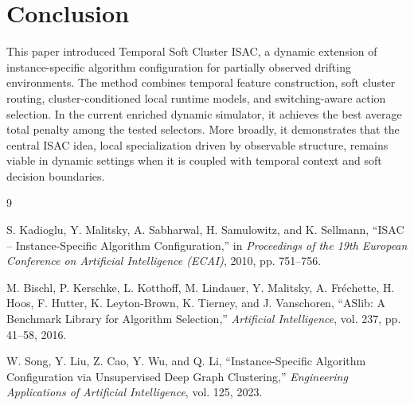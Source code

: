\documentclass[conference]{IEEEtran}
\begin{document}
\section{Conclusion}

This paper introduced Temporal Soft Cluster ISAC, a dynamic extension of instance-specific algorithm configuration for partially observed drifting environments. The method combines temporal feature construction, soft cluster routing, cluster-conditioned local runtime models, and switching-aware action selection. In the current enriched dynamic simulator, it achieves the best average total penalty among the tested selectors. More broadly, it demonstrates that the central ISAC idea, local specialization driven by observable structure, remains viable in dynamic settings when it is coupled with temporal context and soft decision boundaries.

\begin{thebibliography}{9}

S. Kadioglu, Y. Malitsky, A. Sabharwal, H. Samulowitz, and K. Sellmann,
``ISAC -- Instance-Specific Algorithm Configuration,''
in \emph{Proceedings of the 19th European Conference on Artificial Intelligence (ECAI)}, 2010, pp. 751--756.

M. Bischl, P. Kerschke, L. Kotthoff, M. Lindauer, Y. Malitsky, A. Fr\'echette, H. Hoos, F. Hutter, K. Leyton-Brown, K. Tierney, and J. Vanschoren,
``ASlib: A Benchmark Library for Algorithm Selection,''
\emph{Artificial Intelligence}, vol. 237, pp. 41--58, 2016.

W. Song, Y. Liu, Z. Cao, Y. Wu, and Q. Li,
``Instance-Specific Algorithm Configuration via Unsupervised Deep Graph Clustering,''
\emph{Engineering Applications of Artificial Intelligence}, vol. 125, 2023.

\end{thebibliography}
\end{document}
